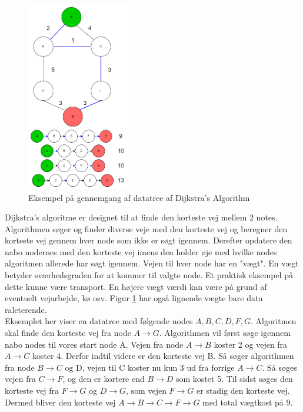 \documentclass[12pt]{article}
\begin{document}
\begin{figure} %
  \includegraphics[width=0.4\textwidth, height=0.417\textheight]{img/AlgoViz.png}
  \caption{Eksempel på gennemgang af datatree af Dijkstra’s Algorithm}\label{eksempel af datatree}
  \centering
\end{figure}

Dijkstra’s algoritme er designet til at finde den korteste vej mellem 2 notes. Algorithmen søger og finder diverse veje med den korteste vej og beregner den korteste vej gennem hver node som ikke er søgt igennem. Derefter opdatere den nabo nodernes med den korteste vej imens den holder øje med hvilke nodes algoritmen allerede har søgt igennem. Vejen til hver node har en "vægt". En vægt betyder sværhedsgraden for at kommer til valgte node. Et praktisk eksempel på dette kunne være transport. En højere vægt værdi kan være på grund af eventuelt vejarbejde, kø osv. Figur \ref{eksempel af datatree} har også lignende vægte bare data raleterende.
\\Eksemplet her viser en datatree med følgende nodes $A,B,C,D,F,G$. Algoritmen skal finde den korteste vej fra node $A \rightarrow G$. Algorithmen vil først søge igennem nabo nodes til vores start node A. Vejen fra node $A \rightarrow B$ koster 2 og vejen fra $A \rightarrow C$ koster 4. Derfor indtil videre er den korteste vej B. Så søger algorithmen fra node $B \rightarrow C$ og D, vejen til C koster nu kun 3 ud fra forrige $A \rightarrow C$. Så søges vejen fra $C \rightarrow F$, og den er kortere end $B \rightarrow D$ som kostet 5. Til sidst søges den korteste vej fra $F \rightarrow G$ og $D \rightarrow G$, som vejen $F \rightarrow G$ er stadig den korteste vej. Dermed bliver den korteste vej $A \rightarrow B \rightarrow C \rightarrow F \rightarrow G$ med total vægtkost på 9. 
\end{document}

